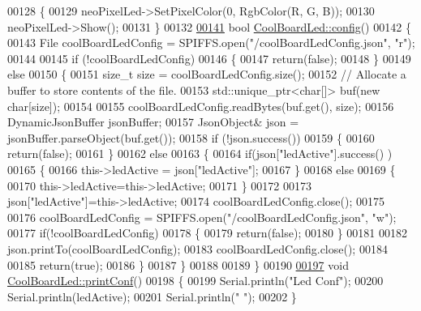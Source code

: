 \begin{DoxyCode}
00128 \{
00129     neoPixelLed->SetPixelColor(0, RgbColor(R, G, B));
00130     neoPixelLed->Show();
00131 \}
00132 
\hyperlink{class_cool_board_led_a1b60e5e30bea96c49ed62ed1bf1ffc8b}{00141} \textcolor{keywordtype}{bool} \hyperlink{class_cool_board_led_a1b60e5e30bea96c49ed62ed1bf1ffc8b}{CoolBoardLed::config}()
00142 \{
00143     File coolBoardLedConfig = SPIFFS.open(\textcolor{stringliteral}{"/coolBoardLedConfig.json"}, \textcolor{stringliteral}{"r"});
00144 
00145     \textcolor{keywordflow}{if} (!coolBoardLedConfig) 
00146     \{
00147         \textcolor{keywordflow}{return}(\textcolor{keyword}{false});
00148     \}
00149     \textcolor{keywordflow}{else}
00150     \{
00151         \textcolor{keywordtype}{size\_t} size = coolBoardLedConfig.size();
00152         \textcolor{comment}{// Allocate a buffer to store contents of the file.}
00153         std::unique\_ptr<char[]> buf(\textcolor{keyword}{new} \textcolor{keywordtype}{char}[size]);
00154 
00155         coolBoardLedConfig.readBytes(buf.get(), size);
00156         DynamicJsonBuffer jsonBuffer;
00157         JsonObject& json = jsonBuffer.parseObject(buf.get());
00158         \textcolor{keywordflow}{if} (!json.success()) 
00159         \{
00160               \textcolor{keywordflow}{return}(\textcolor{keyword}{false});
00161         \} 
00162         \textcolor{keywordflow}{else}
00163         \{     
00164             \textcolor{keywordflow}{if}(json[\textcolor{stringliteral}{"ledActive"}].success() )
00165             \{
00166                 this->ledActive = json[\textcolor{stringliteral}{"ledActive"}]; 
00167             \}
00168             \textcolor{keywordflow}{else}
00169             \{
00170                 this->ledActive=this->ledActive;            
00171             \}
00172             
00173             json[\textcolor{stringliteral}{"ledActive"}]=this->ledActive;
00174             coolBoardLedConfig.close();
00175             
00176             coolBoardLedConfig = SPIFFS.open(\textcolor{stringliteral}{"/coolBoardLedConfig.json"}, \textcolor{stringliteral}{"w"});
00177             \textcolor{keywordflow}{if}(!coolBoardLedConfig)
00178             \{
00179                 \textcolor{keywordflow}{return}(\textcolor{keyword}{false});          
00180             \}
00181 
00182             json.printTo(coolBoardLedConfig);
00183             coolBoardLedConfig.close();
00184 
00185               \textcolor{keywordflow}{return}(\textcolor{keyword}{true}); 
00186         \}
00187     \}   
00188 
00189 \}               
00190 
\hyperlink{class_cool_board_led_a8ed3053a36f0ed4a131f43b5b17efb61}{00197} \textcolor{keywordtype}{void} \hyperlink{class_cool_board_led_a8ed3053a36f0ed4a131f43b5b17efb61}{CoolBoardLed::printConf}()
00198 \{
00199     Serial.println(\textcolor{stringliteral}{"Led Conf"});
00200     Serial.println(ledActive);
00201     Serial.println(\textcolor{stringliteral}{" "});    
00202 \}
\end{DoxyCode}
